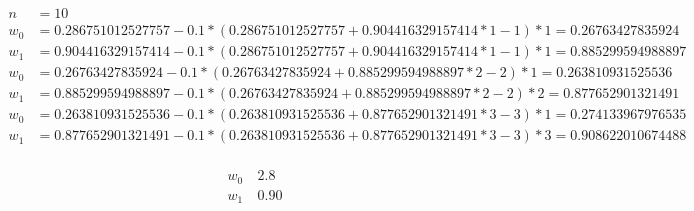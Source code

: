 \documentclass{report}
\begin{document}
\begin{equation} \label{eq1}
\begin{split}
n & = 10 \\
w_0 & = 0.286751012527757 - 0.1 * (0.286751012527757+0.904416329157414*1-1) * 1 = 0.26763427835924\\
w_1 & = 0.904416329157414 - 0.1 * (0.286751012527757+0.904416329157414*1-1) * 1 = 0.885299594988897\\
w_0 & = 0.26763427835924 - 0.1 * (0.26763427835924+0.885299594988897*2-2) * 1 = 0.263810931525536\\
w_1 & = 0.885299594988897 - 0.1 * (0.26763427835924+0.885299594988897*2-2) * 2 = 0.877652901321491\\
w_0 & = 0.263810931525536 - 0.1 * (0.263810931525536+0.877652901321491*3-3) * 1 = 0.274133967976535\\
w_1 & = 0.877652901321491 - 0.1 * (0.263810931525536+0.877652901321491*3-3) * 3 = 0.908622010674488\\
\end{split}
\end{equation}

\begin{equation} \label{eq1}
\begin{split}
w_0 & ~ 2.8\\
w_1 & ~ 0.90\\
\end{split}
\end{equation}
\end{document}
